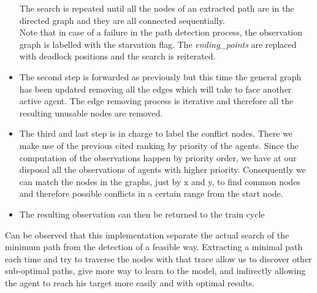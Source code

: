 \begin{itemize}
    The search is repeated until all the nodes of an extracted path are in the directed graph and they are all connected sequentially.\\ 
    Note that in case of a failure in the path detection process, the observation graph is labelled with the starvation flag. The \textit{ending\_points} are replaced with deadlock positions and the search is reiterated.\\
    \item The second step is forwarded as previously but this time the general graph has been updated removing all the edges which will take to face another active agent. The edge removing process is iterative and therefore all the resulting unusable nodes are removed.
    \item The third and last step is in charge to label the conflict nodes. There we make use of the previous cited ranking by priority of the agents. Since the computation of the observations happen by priority order, we have at our disposal all the observations of agents with higher priority. Consequently we can match the nodes in the graphs, just by x and y, to find common nodes and therefore possible conflicts in a certain range from the start node.
    \item The resulting observation can then be returned to the train cycle
\end{itemize}
\vspace{1cm} 
Can be observed that this implementation separate the actual search of the minimum path from the detection of a feasible way. Extracting a minimal path each time and try to traverse the nodes with that trace allow us to discover other sub-optimal paths, give more way to learn to the model, and indirectly allowing the agent to reach his target more easily and with optimal results.


